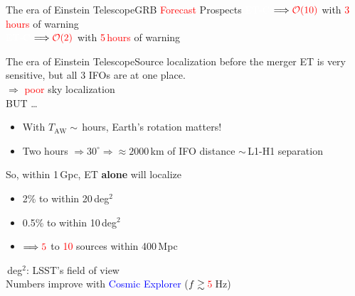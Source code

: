\documentclass[xcolor=dvipsnames,t]{beamer}
\newcommand{\red}[1]{\textcolor{red}{#1}}
\newcommand{\bl}[1]{\textcolor{blue}{#1}}
\newcommand{\ord}{\mathcal{O}}
\begin{document}
\begin{frame}{The era of Einstein Telescope}{GRB \red{Forecast} Prospects }
  \vspace{1mm}
  \textcolor{white}{ET-C} $\Longrightarrow \red{\ord(10)}$ with \red{3\,hours} of warning \\
  \vspace{1mm}
  \textcolor{white}{ET-C} $\Longrightarrow \red{\ord(2)}$ with \red{5\,hours} of warning
\end{frame}

\begin{frame}{The era of Einstein Telescope}{Source localization before the merger} 
  ET is very sensitive, but all 3 IFOs are at one place. \\
  \vspace{1mm}
  $\Longrightarrow$ \red{poor} sky localization \\
  \vspace{1mm}
  BUT \ldots \\
  \begin{itemize}
  \item With $T_\text{AW} \sim\,$hours, Earth's rotation matters!
  \item Two hours $\Rightarrow 30^\circ \Rightarrow \approx 2000\,$km of IFO distance $\sim\,$L1-H1 separation
  \end{itemize}
  So, within 1\,Gpc, ET {\bf alone} will localize
  \begin{itemize}
  \item 2\% to within 20\,deg$^2$
  \item 0.5\% to within 10\,deg$^2$ 
  \item[]$\Longrightarrow \red{5}$ to \red{10} sources within 400\,Mpc
  \end{itemize}
  \,deg$^2$: LSST's field of view\\
  \vspace{2mm}
   Numbers improve with \bl{Cosmic Explorer} ($f\gtrsim \red{5}\,$Hz)
\end{frame}
\end{document}
